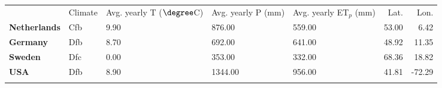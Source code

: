 \begin{tabular}{lllllrr}
\tophline
 & Climate & Avg. yearly T ($\degree$C) & Avg. yearly P (mm) & Avg. yearly ET$_p$ (mm) & Lat. & Lon. \\
\middlehline
\textbf{Netherlands} & Cfb & 9.90 & 876.00 & 559.00 & 53.00 & 6.42 \\
\textbf{Germany} & Dfb & 8.70 & 692.00 & 641.00 & 48.92 & 11.35 \\
\textbf{Sweden} & Dfc & 0.00 & 353.00 & 332.00 & 68.36 & 18.82 \\
\textbf{USA} & Dfb & 8.90 & 1344.00 & 956.00 & 41.81 & -72.29 \\
\bottomhline
\end{tabular}
